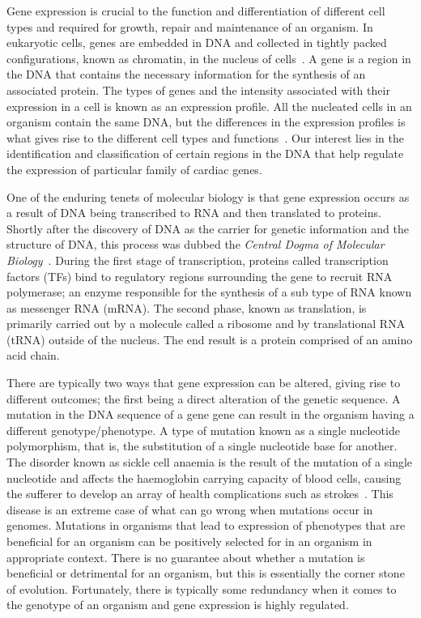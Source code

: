 
        Gene expression is crucial to the function and differentiation of different cell types and required for growth, repair and maintenance of an organism.  In eukaryotic cells, genes are embedded in DNA and collected in tightly packed configurations, known as chromatin, in the nucleus of cells~\cite{alberts2002chromosomal}. A gene is a region in the DNA that contains the necessary information for the synthesis of an associated protein. The types of genes and the intensity associated with their expression in a cell is known as an expression profile. All the nucleated cells in an organism contain the same DNA, but the differences in the expression profiles is what gives rise to the different cell types and functions~\cite{lockhart2000genomics}. Our interest lies in the identification and classification of certain regions in the DNA that help regulate the expression of particular family of cardiac genes. 
        
        One of the enduring tenets of molecular biology is that gene expression occurs as a result of DNA being transcribed to RNA and then translated to proteins. Shortly after the discovery of DNA as the carrier for genetic information and the structure of DNA, this process was dubbed the \emph{Central Dogma of Molecular Biology}~\cite{crick1958protein, macleod1944studies, watson1953structure}. During the first stage of transcription, proteins called transcription factors (TFs) bind to regulatory regions surrounding the gene to recruit RNA polymerase; an enzyme responsible for the synthesis of a sub type of RNA known as messenger RNA (mRNA). The second phase, known as translation, is primarily carried out by a molecule called a ribosome and by translational RNA (tRNA) outside of the nucleus. The end result is a protein comprised of an amino acid chain.
        
        There are typically two ways that gene expression can be altered, giving rise to different outcomes; the first being a direct alteration of the genetic sequence. A mutation in the DNA sequence of a gene gene can result in the organism having a different genotype/phenotype. A type of mutation known as a single nucleotide polymorphism, that is, the substitution of a single nucleotide base for another. The disorder known as sickle cell anaemia is the result of the mutation of a single nucleotide and affects the haemoglobin carrying capacity of blood cells, causing the sufferer to develop an array of health complications such as strokes~\cite{clancy2008dna}. This disease is an extreme case of what can go wrong when mutations occur in genomes. Mutations in organisms that lead to expression of phenotypes that are beneficial for an organism can be positively selected for in an organism in appropriate context. There is no guarantee about whether a mutation is beneficial or detrimental for an organism, but  this is essentially the corner stone of evolution. Fortunately, there is typically some redundancy when it comes to the genotype of an organism and gene expression is highly regulated.
        
